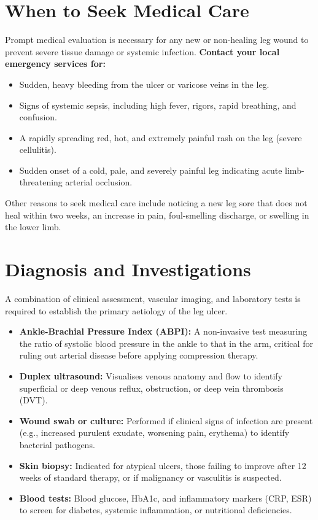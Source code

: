 \section*{When to Seek Medical Care}
Prompt medical evaluation is necessary for any new or non-healing leg wound to prevent severe tissue damage or systemic infection.
\textbf{Contact your local emergency services for:}
\begin{itemize}
    \item Sudden, heavy bleeding from the ulcer or varicose veins in the leg.
    \item Signs of systemic sepsis, including high fever, rigors, rapid breathing, and confusion.
    \item A rapidly spreading red, hot, and extremely painful rash on the leg (severe cellulitis).
    \item Sudden onset of a cold, pale, and severely painful leg indicating acute limb-threatening arterial occlusion.
\end{itemize}
Other reasons to seek medical care include noticing a new leg sore that does not heal within two weeks, an increase in pain, foul-smelling discharge, or swelling in the lower limb.

\section*{Diagnosis and Investigations}
A combination of clinical assessment, vascular imaging, and laboratory tests is required to establish the primary aetiology of the leg ulcer.
\begin{itemize}
    \item \textbf{Ankle-Brachial Pressure Index (ABPI):} A non-invasive test measuring the ratio of systolic blood pressure in the ankle to that in the arm, critical for ruling out arterial disease before applying compression therapy.
    \item \textbf{Duplex ultrasound:} Visualises venous anatomy and flow to identify superficial or deep venous reflux, obstruction, or deep vein thrombosis (DVT).
    \item \textbf{Wound swab or culture:} Performed if clinical signs of infection are present (e.g., increased purulent exudate, worsening pain, erythema) to identify bacterial pathogens.
    \item \textbf{Skin biopsy:} Indicated for atypical ulcers, those failing to improve after 12 weeks of standard therapy, or if malignancy or vasculitis is suspected.
    \item \textbf{Blood tests:} Blood glucose, HbA1c, and inflammatory markers (CRP, ESR) to screen for diabetes, systemic inflammation, or nutritional deficiencies.
\end{itemize}

